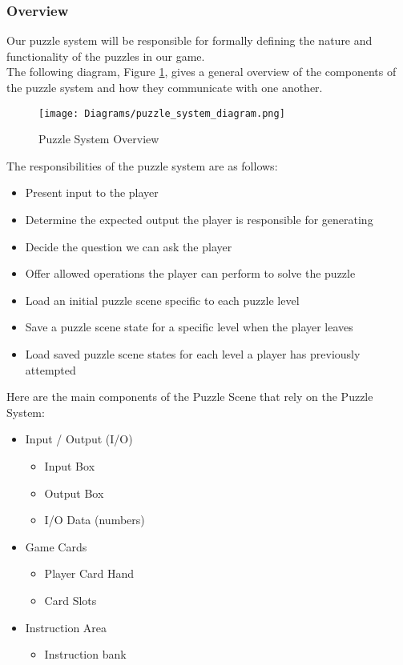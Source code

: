 \subsubsection{Overview}
Our puzzle system will be responsible for formally defining the nature and
functionality of the puzzles in our game.\\

The following diagram, Figure \ref{fig:puzzle_system_diagram}, gives a general overview of the components
of the puzzle system and how they communicate with one another.

\begin{figure}[!hb]
  \caption{Puzzle System Overview}
  \label{fig:puzzle_system_diagram}
  \centering
  \texttt{[image: Diagrams/puzzle\_system\_diagram.png]}
\end{figure}
\vfill
\clearpage

The responsibilities of the puzzle system are as follows:

\begin{itemize}
	\item Present input to the player
	\item Determine the expected output the player is responsible for generating
	\item Decide the question we can ask the player
	\item Offer allowed operations the player can perform to solve the puzzle
	\item Load an initial puzzle scene specific to each puzzle level
	\item Save a puzzle scene state for a specific level when the player leaves
	\item Load saved puzzle scene states for each level a player has previously attempted
\end{itemize}

Here are the main components of the Puzzle Scene that rely on the Puzzle System:

\begin{itemize}
	\item Input / Output (I/O)
	\begin{itemize}
		\item Input Box
		\item Output Box
		\item I/O Data (numbers)
	\end{itemize}

	\item Game Cards
	\begin{itemize}
		\item Player Card Hand
		\item Card Slots
	\end{itemize}

	\item Instruction Area
	\begin{itemize}
		\item Instruction bank
	\end{itemize}
\end{itemize}

